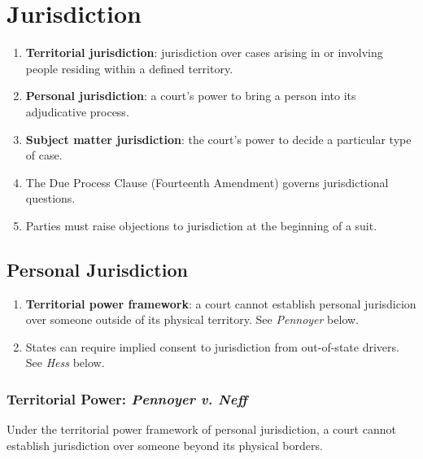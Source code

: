 \section{Jurisdiction}

\begin{enumerate}
    \item \textbf{Territorial jurisdiction}: jurisdiction over cases arising 
    in or involving people residing within a defined territory.
    \item \textbf{Personal jurisdiction}: a court's power to bring a person 
    into its adjudicative process.
    \item \textbf{Subject matter jurisdiction}: the court's power to decide a 
    particular type of case.
    \item The Due Process Clause (Fourteenth Amendment) governs jurisdictional 
    questions.
    \item Parties must raise objections to jurisdiction at the beginning of a 
    suit.
\end{enumerate}

\subsection{Personal Jurisdiction}

\begin{enumerate}
    \item \textbf{Territorial power framework}: a court cannot establish 
    personal jurisdicion over someone outside of its physical territory. See 
    \emph{Pennoyer} below.
    \item States can require implied consent to jurisdiction from out-of-state 
    drivers. See \emph{Hess} below.
\end{enumerate}

\subsubsection{Territorial Power: \emph{Pennoyer v. Neff}}

Under the territorial power framework of personal jurisdiction, a court cannot 
establish jurisdiction over someone beyond its physical borders.

